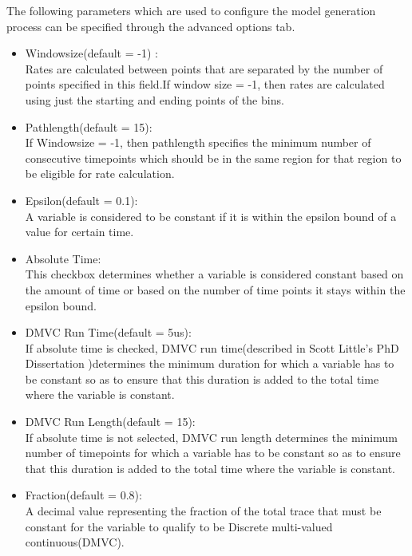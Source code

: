 \documentclass[titlepage,11pt]{article}
\begin{document}
\noindent
The following parameters which are used to configure the model generation 
process can be specified through the advanced options tab.
\begin{itemize}
\item Windowsize(default = -1) : \\Rates are calculated between points 
that are separated by the number of points specified in this field.If 
window size = -1, then rates are calculated using just the starting and
 ending points of the bins.
\item Pathlength(default = 15): \\If Windowsize = -1, then pathlength 
specifies the minimum number of consecutive timepoints which should be
 in the same region for that region to be eligible for rate calculation.
\item Epsilon(default = 0.1): \\ A variable is considered to be constant
 if it is within the epsilon bound of a value for certain time.
\item Absolute Time: \\ This checkbox determines whether a variable is 
considered constant based on the amount of time or based on the number
 of time points it stays within the epsilon bound.
\item DMVC Run Time(default = 5us): \\ If absolute time is checked, DMVC
 run time(described in 
Scott Little's PhD Dissertation
)determines the minimum duration for which a variable has to be
 constant so as to ensure that this duration is added to the total time 
where the variable is constant. 
\item DMVC Run Length(default = 15): \\ If absolute time is not selected,
 DMVC run length determines the minimum number of timepoints for which a
 variable has to be constant so as to ensure that this duration is added
 to the total time where the variable is constant. 
\item Fraction(default = 0.8): \\ A decimal value representing the fraction
 of the total trace that must be constant for the variable to qualify to 
be Discrete multi-valued continuous(DMVC).
\end{itemize}
\end{document}
